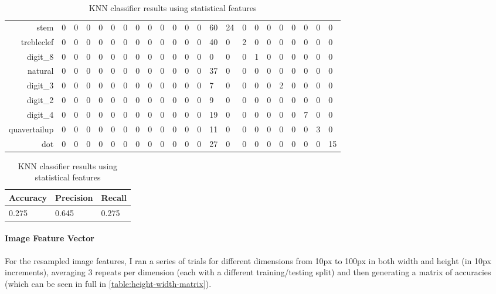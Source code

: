 \begin{table}
\begin{subtable}[b]{\linewidth}
\begin{tabularx}{\textwidth}{r|XXXXXXXXXXXXXXXXXXXXXX}
    stem & 0 & 0 & 0 & 0 & 0 & 0 & 0 & 0 & 0 & 0 & 0 & 0 & 60 & 24 & 0 & 0 & 0 & 0 & 0 & 0 & 0 & 0 \\
    trebleclef & 0 & 0 & 0 & 0 & 0 & 0 & 0 & 0 & 0 & 0 & 0 & 0 & 40 & 0 & 2 & 0 & 0 & 0 & 0 & 0 & 0 & 0 \\
    digit\_8 & 0 & 0 & 0 & 0 & 0 & 0 & 0 & 0 & 0 & 0 & 0 & 0 & 0 & 0 & 0 & 1 & 0 & 0 & 0 & 0 & 0 & 0 \\
    natural & 0 & 0 & 0 & 0 & 0 & 0 & 0 & 0 & 0 & 0 & 0 & 0 & 37 & 0 & 0 & 0 & 0 & 0 & 0 & 0 & 0 & 0 \\
    digit\_3 & 0 & 0 & 0 & 0 & 0 & 0 & 0 & 0 & 0 & 0 & 0 & 0 & 7 & 0 & 0 & 0 & 0 & 2 & 0 & 0 & 0 & 0 \\
    digit\_2 & 0 & 0 & 0 & 0 & 0 & 0 & 0 & 0 & 0 & 0 & 0 & 0 & 9 & 0 & 0 & 0 & 0 & 0 & 0 & 0 & 0 & 0 \\
    digit\_4 & 0 & 0 & 0 & 0 & 0 & 0 & 0 & 0 & 0 & 0 & 0 & 0 & 19 & 0 & 0 & 0 & 0 & 0 & 0 & 7 & 0 & 0 \\
    quavertailup & 0 & 0 & 0 & 0 & 0 & 0 & 0 & 0 & 0 & 0 & 0 & 0 & 11 & 0 & 0 & 0 & 0 & 0 & 0 & 0 & 3 & 0 \\
    dot & 0 & 0 & 0 & 0 & 0 & 0 & 0 & 0 & 0 & 0 & 0 & 0 & 27 & 0 & 0 & 0 & 0 & 0 & 0 & 0 & 0 & 15 \\
    \end{tabularx}
  \end{subtable}

  \vspace{0.8cm}

  \begin{subtable}[b]{.4\linewidth}
    \begin{tabularx}{\linewidth}{lll}
      \toprule
      Accuracy & Precision & Recall \\
      \midrule
      0.275 & 0.645 & 0.275 \\
      \bottomrule
    \end{tabularx}
  \end{subtable}

  \caption{KNN classifier results using statistical features}
  \label{fig:knn-stats}
\end{table}

\paragraph{Image Feature Vector}
\label{sec:knn-image}
For the resampled image features, I ran a series of trials for different dimensions from 10px to 100px in both width and height (in 10px increments), averaging 3 repeats per dimension (each with a different training/testing split) and then generating a matrix of accuracies (which can be seen in full in \cref{table:height-width-matrix}).

